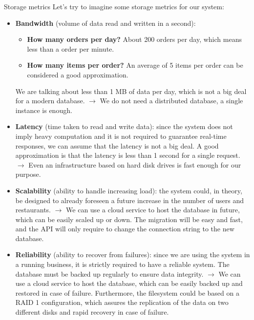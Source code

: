 \begin{frame}[allowframebreaks]{Storage metrics}
	Let's try to imagine some storage metrics for our system:

	\begin{itemize}
		\item \textbf{Bandwidth} (volume of data read and written in a second):
		      \begin{itemize}
			      \item{\textbf{How many orders per day?} About 200 orders per day, which %
			            means less than a order per minute.}
			      \item{\textbf{How many items per order?} An average of 5 items per order %
			            can be considered a good approximation.}
		      \end{itemize}
		      We are talking about less than 1 MB of data per day, which is not a big deal
		      for a modern database. $\rightarrow$ \textcolor{UNITSBlue}{We do not need a %
			      distributed database, a single instance is enough.}
		\item \textbf{Latency} (time taken to read and write data): since the system does %
		      not imply heavy computation and it is not required to guarantee real-time %
		      responses, we can assume that the latency is not a big deal. A good %
		      approximation is that the latency is less than 1 second for a single %
		      request. $\rightarrow$ \textcolor{UNITSBlue}{Even an infrastructure based on %
			      hard disk drives is fast enough  for our purpose.}
		\item \textbf{Scalability} (ability to handle increasing load): the system could, %
		      in theory, be designed to already foreseen a future increase in the number of %
		      users and restaurants. $\rightarrow$ \textcolor{UNITSBlue}{We can use a cloud %
			      service to host the database in future, which can be easily scaled up or down. %
			      The migration will be easy and fast, and the API will only require to change the %
			      connection string to the new database.}
		\item \textbf{Reliability} (ability to recover from failures): since we are using %
		      the system in a running business, it is strictly required to have a %
		      reliable system. The database must be backed up regularly to ensure data %
		      integrity. $\rightarrow$ \textcolor{UNITSBlue}{We can use a cloud service to host %
			      the database, which can be easily backed up and restored in case of failure. Furthermore, %
			      the filesystem could be based on a RAID 1 configuration, which assures the replication %
			      of the data on two different disks and rapid recovery in case of failure.}
	\end{itemize}

\end{frame}
